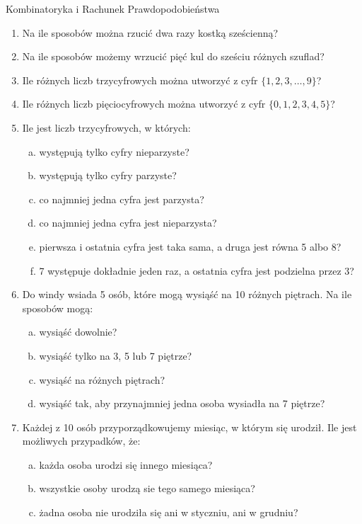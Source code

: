 \documentclass[12pt,a4paper]{article}
\begin{document}
	\begin{center}
		\LARGE Kombinatoryka i Rachunek Prawdopodobieństwa
	\end{center}
	\vspace{1cm}
	\begin{enumerate}[1.]
	\item Na ile sposobów można rzucić dwa razy kostką sześcienną?
	\item Na ile sposobów możemy wrzucić pięć kul do sześciu różnych szuflad?
	\item Ile różnych liczb trzycyfrowych można utworzyć z cyfr $\{1,2,3,\dots,9\}$?
	\item Ile różnych liczb pięciocyfrowych można utworzyć z cyfr $\{0,1,2,3,4,5\}$?
		\item Ile jest liczb trzycyfrowych, w których:
	\begin{enumerate}[a)]
		\item występują tylko cyfry nieparzyste?
		\item występują tylko cyfry parzyste?
		\item co najmniej jedna cyfra jest parzysta?
		\item co najmniej jedna cyfra jest nieparzysta?
		\item pierwsza i ostatnia cyfra jest taka sama, a druga jest równa 5 albo 8?
		\item 7 występuje dokładnie jeden raz, a ostatnia cyfra jest podzielna przez 3?
	\end{enumerate}
	\item Do windy wsiada 5 osób, które mogą wysiąść na 10 różnych piętrach. Na ile sposobów mogą:
	\begin{enumerate}[a)]
		\item wysiąść dowolnie?
		\item wysiąść tylko na 3, 5 lub 7 piętrze?
		\item wysiąść na różnych piętrach?
		\item wysiąść tak, aby przynajmniej jedna osoba wysiadła na 7 piętrze?
	\end{enumerate}
	\item Każdej z 10 osób przyporządkowujemy miesiąc, w którym się urodził. Ile jest możliwych przypadków, że:
	\begin{enumerate}[a)]
		\item każda osoba urodzi się innego miesiąca?
		\item wszystkie osoby urodzą sie tego samego miesiąca?
		\item żadna osoba nie urodziła się ani w styczniu, ani w grudniu?

\end{enumerate}
\end{enumerate}
\end{document}
